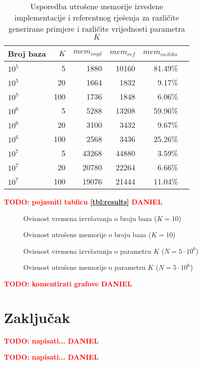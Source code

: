 \documentclass[times, utf8, seminar, numeric]{fer}
\newcommand\todo[1]{\textbf{\textcolor{red}{TODO: #1}}}
\begin{document}
\begin{table}[h]
	\centering
	\caption{Usporedba utrošene memorije izvedene implementacije i referentnog rješenja za različite generirane primjere i različite vrijednosti parametra $K$}
	\label{tbl:memory-generated}
	
	\begin{tabular}{lrrrrr}
		\hline
        Broj baza & $K$ & $mem_{impl}$ & $mem_{ref}$ & $mem_{razlika}$ \\ \hline
        $10^5$ & 5 & 1880 & 10160 & 81.49\% \\
        $10^5$ & 20 & 1664 & 1832 & 9.17\% \\
        $10^5$ & 100 & 1736 & 1848 & 6.06\% \\ \hline
        $10^6$ & 5 & 5288 & 13208 & 59.96\% \\
        $10^6$ & 20 & 3100 & 3432 & 9.67\% \\
        $10^6$ & 100 & 2568 & 3436 & 25.26\% \\ \hline
        $10^7$ & 5 & 43268 & 44880 & 3.59\% \\
        $10^7$ & 20 & 20780 & 22264 & 6.66\% \\
        $10^7$ & 100 & 19076 & 21444 & 11.04\% \\
    \hline
	\end{tabular}
\end{table}



\todo{pojasniti tablicu \ref{tbl:results} DANIEL} \\

\begin{figure}[!h]
	\centering
	\def\svgwidth{.7\columnwidth}
	
  \caption{Ovisnost vremena izvršavanja o broju baza ($K = 10$)}
\end{figure}

\begin{figure}[!h]
	\centering
	\def\svgwidth{.7\columnwidth}
	
  \caption{Ovisnost utrošene memorije o broju baza ($K = 10$)}
\end{figure}

\begin{figure}[!h]
	\centering
	\def\svgwidth{.7\columnwidth}
	
  \caption{Ovisnost vremena izvršavanja o parametru $K$ ($N = 5 \cdot 10^6$)}
\end{figure}

\begin{figure}[!h]
	\centering
	\def\svgwidth{.7\columnwidth}
	
  \caption{Ovisnost utrošene memorije o parametru $K$ ($N = 5 \cdot 10^6$)}
\end{figure}

\todo{komentirati grafove DANIEL} \\

\chapter{Zaključak}
\todo{napisati... DANIEL}




\begin{sazetak}
  \todo{napisati... DANIEL}

\end{sazetak}
\end{document}
